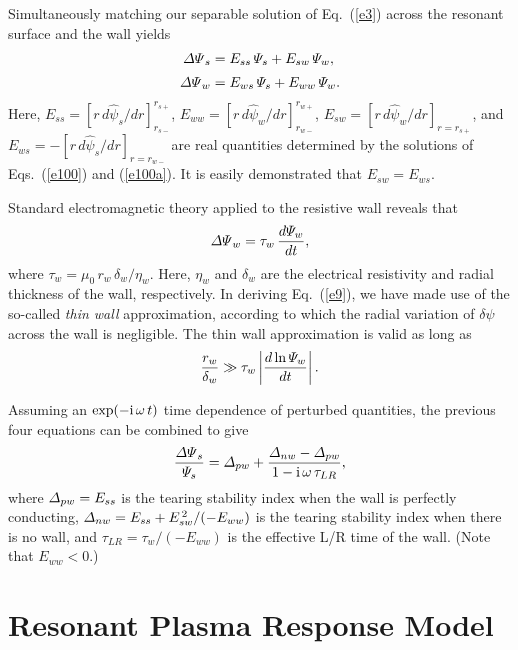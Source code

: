 \documentclass[12pt,prb,aps]{revtex4-1}
\begin{document}
Simultaneously matching our separable solution of Eq.~(\ref{e3})  across the resonant surface and the wall yields\,\cite{rf1993}
\begin{align}
{\mit\Delta\Psi}_s& = E_{ss}\,{\mit\Psi}_s + E_{sw}\,{\mit\Psi}_w,\\[0.5ex]
{\mit\Delta\Psi}_w& = E_{ws}\,{\mit\Psi}_s+ E_{ww}\,{\mit\Psi}_w.
\end{align}
Here, $E_{ss}= [r\,d\hat{\psi}_s/dr]_{r_{s-}}^{r_{s+}}$,
$E_{ww}= [r\,d\hat{\psi}_w/dr]_{r_{w-}}^{r_{w+}}$,
$E_{sw} =[r\,{d\hat\psi}_w/dr]_{r=r_{s+}}$, and 
$E_{ws} =-[r\,{d\hat\psi}_s/dr]_{r=r_{w-}}$
are real quantities determined by the solutions of Eqs.~(\ref{e100}) and (\ref{e100a}).
It is easily demonstrated that 
$E_{sw} = E_{ws}$.\cite{rf1993}

Standard electromagnetic theory applied to the resistive wall reveals that\,\cite{nave,rf1993}
\begin{equation}\label{e9}
{\mit\Delta\Psi}_w = \tau_w\,\frac{d{\mit\Psi}_w}{dt},
\end{equation}
where
$\tau_w= \mu_0\,r_w\,\delta_w/\eta_w$.
Here, $\eta_w$ and $\delta_w$ are the electrical resistivity and radial thickness  of the wall, respectively. 
In deriving Eq.~(\ref{e9}), we have made use of the so-called {\em thin wall}\/ approximation, according to
which the radial variation of $\delta\psi$ across the wall is negligible.  The thin wall approximation is
valid as long as
\begin{equation}
\frac{r_w}{\delta_w}\gg \tau_w\left|\frac{d\ln{\mit\Psi}_w}{dt}\right|.
\end{equation}

Assuming an $\exp(-{\rm i}\,\omega\,t)$ time dependence of perturbed quantities, the previous four equations
can be combined to give
\begin{equation}\label{e11}
\frac{{\mit\Delta\Psi}_s}{{\mit\Psi}_s}= {\mit\Delta}_{pw} + \frac{{\mit\Delta}_{nw}-{\mit\Delta}_{pw}}{1-{\rm i}\,\omega\,\tau_{LR}},
\end{equation}
where ${\mit\Delta}_{pw}= E_{ss}$ is the  tearing stability index\cite{fkr} when the wall is perfectly conducting,
${\mit\Delta}_{nw} = E_{ss} + E_{sw}^{\,2}/(-E_{ww})$ is the  tearing stability index when there is no wall,
and $\tau_{LR}= \tau_w/(-E_{ww})$ is the effective L/R time of the wall. (Note that $E_{ww}<0$.)

\section{Resonant Plasma Response Model}\label{sfour}
\end{document}
